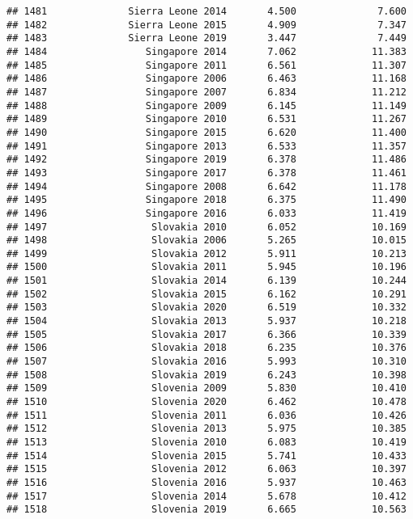 \documentclass[
]{article}
\begin{document}
\begin{verbatim}
## 1481              Sierra Leone 2014       4.500              7.600
## 1482              Sierra Leone 2015       4.909              7.347
## 1483              Sierra Leone 2019       3.447              7.449
## 1484                 Singapore 2014       7.062             11.383
## 1485                 Singapore 2011       6.561             11.307
## 1486                 Singapore 2006       6.463             11.168
## 1487                 Singapore 2007       6.834             11.212
## 1488                 Singapore 2009       6.145             11.149
## 1489                 Singapore 2010       6.531             11.267
## 1490                 Singapore 2015       6.620             11.400
## 1491                 Singapore 2013       6.533             11.357
## 1492                 Singapore 2019       6.378             11.486
## 1493                 Singapore 2017       6.378             11.461
## 1494                 Singapore 2008       6.642             11.178
## 1495                 Singapore 2018       6.375             11.490
## 1496                 Singapore 2016       6.033             11.419
## 1497                  Slovakia 2010       6.052             10.169
## 1498                  Slovakia 2006       5.265             10.015
## 1499                  Slovakia 2012       5.911             10.213
## 1500                  Slovakia 2011       5.945             10.196
## 1501                  Slovakia 2014       6.139             10.244
## 1502                  Slovakia 2015       6.162             10.291
## 1503                  Slovakia 2020       6.519             10.332
## 1504                  Slovakia 2013       5.937             10.218
## 1505                  Slovakia 2017       6.366             10.339
## 1506                  Slovakia 2018       6.235             10.376
## 1507                  Slovakia 2016       5.993             10.310
## 1508                  Slovakia 2019       6.243             10.398
## 1509                  Slovenia 2009       5.830             10.410
## 1510                  Slovenia 2020       6.462             10.478
## 1511                  Slovenia 2011       6.036             10.426
## 1512                  Slovenia 2013       5.975             10.385
## 1513                  Slovenia 2010       6.083             10.419
## 1514                  Slovenia 2015       5.741             10.433
## 1515                  Slovenia 2012       6.063             10.397
## 1516                  Slovenia 2016       5.937             10.463
## 1517                  Slovenia 2014       5.678             10.412
## 1518                  Slovenia 2019       6.665             10.563

\end{verbatim}
\end{document}
